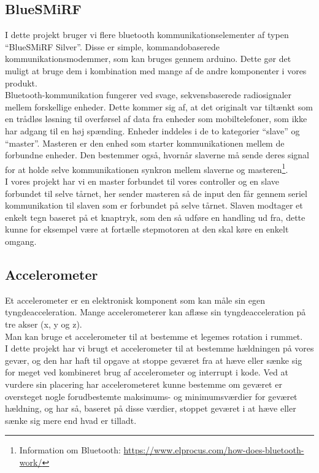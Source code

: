 \subsection{BlueSMiRF}
I dette projekt bruger vi flere bluetooth kommunikationselementer af typen “BlueSMiRF Silver”. Disse er simple, kommandobaserede kommunikationsmodemmer, som kan bruges gennem arduino. Dette gør det muligt at bruge dem i kombination med mange af de andre komponenter i vores produkt.\\

Bluetooth-kommunikation fungerer ved svage, sekvensbaserede radiosignaler mellem forskellige enheder. Dette kommer sig af, at det originalt var tiltænkt som en trådløs løsning til overførsel af data fra enheder som mobiltelefoner, som ikke har adgang til en høj spænding. Enheder inddeles i de to kategorier “slave” og “master”. Masteren er den enhed som starter kommunikationen mellem de forbundne enheder. Den bestemmer også, hvornår slaverne må sende deres signal for at holde selve kommunikationen synkron mellem slaverne og masteren\footnote{Information om Bluetooth: \url{https://www.elprocus.com/how-does-bluetooth-work/} 
}.\\

I vores projekt har vi en master forbundet til vores controller og en slave forbundet til selve tårnet, her sender masteren så de input den får gennem seriel kommunikation til slaven som er forbundet på selve tårnet. Slaven modtager et enkelt tegn baseret på et knaptryk, som den så udføre en handling ud fra, dette kunne for eksempel være at fortælle stepmotoren at den skal køre en enkelt omgang.\\


\subsection{Accelerometer}
Et accelerometer er en elektronisk komponent som kan måle sin egen tyngdeacceleration. Mange accelerometerer kan aflæse sin tyngdeacceleration på tre akser (x, y og z). \\[0.5cm]

Man kan bruge et accelerometer til at bestemme et legemes rotation i rummet.\\[0.5cm] 

I dette projekt har vi brugt et accelerometer til at bestemme hældningen på vores gevær, og den har haft til opgave at stoppe geværet fra at hæve eller sænke sig for meget ved kombineret brug af accelerometer og interrupt i kode. Ved at vurdere sin placering har accelerometeret kunne bestemme om geværet er oversteget nogle forudbestemte maksimums- og minimumsværdier for geværet hældning, og har så, baseret på disse værdier, stoppet geværet i at hæve eller sænke sig mere end hvad er tilladt.



